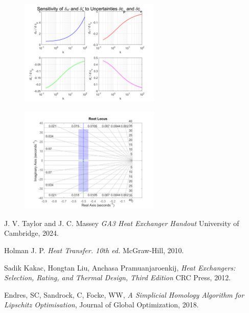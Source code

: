 \documentclass{article}
\begin{document}
\begin{figure}[H]
    \centering
    \includegraphics[width=0.6\textwidth]{figures/u_propagation.png}
    \caption{}
    \label{fig:u_propagation}
\end{figure}

\begin{figure}[H]
    \centering
    \includegraphics[width=0.6\textwidth]{figures/rlocus_G.png}
    \caption{}
    \label{fig:rlocus_G}
\end{figure}


\begin{thebibliography}{9}

    
      J. V. Taylor and J. C. Massey
      \emph{GA3 Heat Exchanger Handout}
      University of Cambridge,
      2024.
    
      Holman J. P.
      \emph{Heat Transfer. 10th ed.}
      McGraw-Hill,
      2010.
    
      Sadik Kakac, Hongtan Liu, Anchasa Pramuanjaroenkij,
      \emph{Heat Exchangers: Selection, Rating, and Thermal Design, Third Edition}
      CRC Press,
      2012.
    
      Endres, SC, Sandrock, C, Focke, WW,
      \emph{A Simplicial Homology Algorithm for Lipschitz Optimisation},
      Journal of Global Optimization,
      2018.
    
\end{thebibliography}
\end{document}
